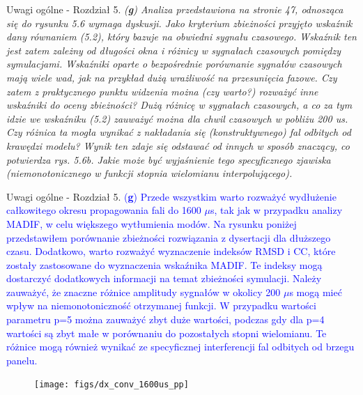 \documentclass[10pt,aspectratio=169]{beamer} %
\begin{document}
\begin{frame}[label=frame19]{Uwagi ogólne - Rozdział 5.}\justifying
\textit{(\textbf{g}) Analiza przedstawiona na stronie 47, odnosząca się do rysunku 5.6 wymaga dyskusji. Jako kryterium zbieżności przyjęto wskaźnik dany równaniem (5.2), który bazuje na obwiedni sygnału czasowego. Wskaźnik ten jest zatem zależny od długości okna i różnicy w sygnałach czasowych pomiędzy symulacjami. Wskaźniki oparte o bezpośrednie porównanie sygnałów czasowych mają wiele wad, jak na przykład dużą wrażliwość na przesunięcia fazowe. Czy zatem z praktycznego punktu widzenia można (czy warto?) rozważyć inne wskaźniki do oceny zbieżności? Dużą różnicę w sygnałach czasowych, a co za tym idzie we wskaźniku (5.2) zauważyć można dla chwil czasowych w pobliżu 200 us. Czy różnica ta mogła wynikać z nakładania się (konstruktywnego) fal odbitych od krawędzi modelu? Wynik ten zdaje się odstawać od innych w sposób znaczący, co potwierdza rys. 5.6b. Jakie może być wyjaśnienie tego specyficznego zjawiska (niemonotonicznego w funkcji stopnia wielomianu interpolującego).}
\end{frame}
\begin{frame}[label=frame19]{Uwagi ogólne - Rozdział 5.}\justifying
\textcolor{blue}{(\textbf{g}) \small{Przede wszystkim warto rozważyć wydłużenie całkowitego okresu propagowania fali do 1600 \(\mu\)s, tak jak w przypadku analizy MADIF, w celu większego wytłumienia modów. Na rysunku poniżej przedstawiłem porównanie zbieżności rozwiązania z dysertacji dla dłuższego czasu. Dodatkowo, warto rozważyć wyznaczenie indeksów RMSD i CC, które zostały zastosowane do wyznaczenia wskaźnika MADIF. Te indeksy mogą dostarczyć dodatkowych informacji na temat zbieżności symulacji. Należy zauważyć, że znaczne różnice amplitudy sygnałów w okolicy 200 \(\mu\)s mogą mieć wpływ na niemonotoniczność otrzymanej funkcji. W przypadku wartości parametru p=5 można zauważyć zbyt duże wartości, podczas gdy dla p=4 wartości są zbyt małe w porównaniu do pozostałych stopni wielomianu. Te różnice mogą również wynikać ze specyficznej interferencji fal odbitych od brzegu panelu.}}
\end{frame}
\begin{figure}
	\centering
	\texttt{[image: figs/dx\_conv\_1600us\_pp]}
\end{figure}
\end{document}
